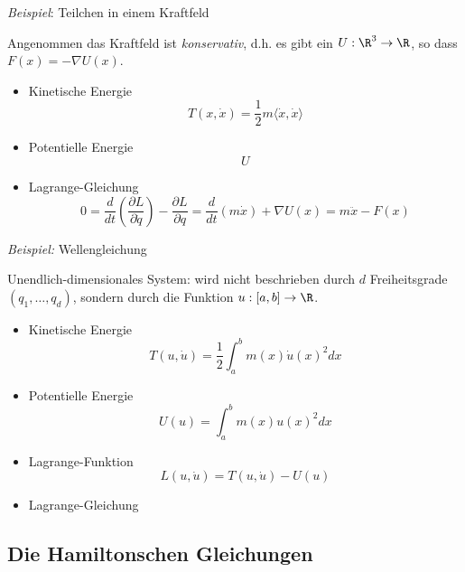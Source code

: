 \emph{Beispiel}: Teilchen in einem Kraftfeld

Angenommen das Kraftfeld ist \emph{konservativ}, d.h. es gibt ein $U: \R^3 \to \R$, so dass $F(x) = -\nabla U(x)$.
\begin{itemize}
\item Kinetische Energie
  \begin{equation*}
    T(x, \dot x) = \frac12 m \langle \dot x, \dot x \rangle
  \end{equation*}
\item Potentielle Energie
  \begin{equation*}
    U
  \end{equation*}
\item Lagrange-Gleichung
  \begin{equation*}
    0
    = \frac{d}{dt} \left( \frac{\partial L}{\partial \dot q} \right) - \frac{\partial L}{\partial q}
    = \frac{d}{dt}(m\dot x) + \nabla U(x) = m\ddot x - F(x)
  \end{equation*}
\end{itemize}

\emph{Beispiel:} Wellengleichung

Unendlich-dimensionales System: wird nicht beschrieben durch $d$ Freiheitsgrade $(q_1, \dots, q_d)$, sondern durch die Funktion $u: [a, b] \to \R$.

\begin{itemize}
\item Kinetische Energie
  \begin{equation*}
    T(u, \dot u) = \frac12 \int_a^b m(x) \dot u(x)^2 dx
  \end{equation*}
\item Potentielle Energie
  \begin{equation*}
    U(u) = \int_a^b m(x)u(x)^2 dx
  \end{equation*}
\item Lagrange-Funktion
  \begin{equation*}
    L(u, \dot u) = T(u, \dot u) - U(u)
  \end{equation*}
\item Lagrange-Gleichung

  \bigskip
\end{itemize}

\subsection{Die Hamiltonschen Gleichungen}

